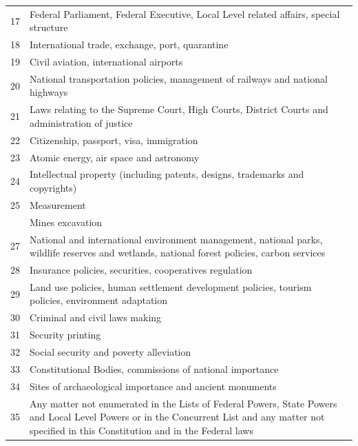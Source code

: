 \documentclass[
  openany]{book}
\begin{document}
\begin{longtable}[t]{r>{\raggedright\arraybackslash}p{35em}}
\rowcolor{gray!6}  17 & Federal Parliament, Federal Executive, Local Level related affairs, special structure\\
18 & International trade, exchange, port, quarantine\\
\rowcolor{gray!6}  19 & Civil aviation, international airports\\
20 & National transportation policies, management of railways and national highways\\
\addlinespace
\rowcolor{gray!6}  21 & Laws relating to the Supreme Court, High Courts, District Courts and administration of justice\\
22 & Citizenship, passport, visa, immigration\\
\rowcolor{gray!6}  23 & Atomic energy, air space and astronomy\\
24 & Intellectual property (including patents, designs, trademarks and copyrights)\\
\rowcolor{gray!6}  25 & Measurement\\
\addlinespace
26 & Mines excavation\\
\rowcolor{gray!6}  27 & National and international environment management, national parks, wildlife reserves and wetlands, national forest policies, carbon services\\
28 & Insurance policies, securities, cooperatives regulation\\
\rowcolor{gray!6}  29 & Land use policies, human settlement development policies, tourism policies, environment adaptation\\
30 & Criminal and civil laws making\\
\addlinespace
\rowcolor{gray!6}  31 & Security printing\\
32 & Social security and poverty alleviation\\
\rowcolor{gray!6}  33 & Constitutional Bodies, commissions of national importance\\
34 & Sites of archaeological importance and ancient monuments\\
\rowcolor{gray!6}  35 & Any matter not enumerated in the Lists of Federal Powers, State Powers and Local Level Powers or in the Concurrent List and any matter not specified in this Constitution and in the Federal laws\\
\bottomrule
\end{longtable}
\endgroup{}

\begingroup\fontsize{10}{12}\selectfont
\end{document}
